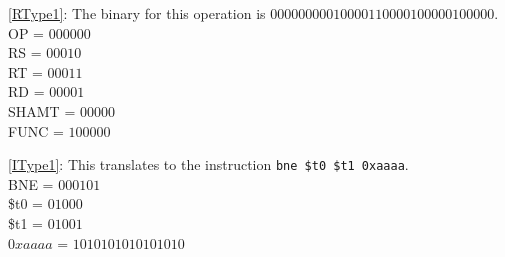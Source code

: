 \documentclass{article}
\begin{document}
\ref{RType1}: The binary for this operation is $000000 00010 00011 00001 00000 100000$. \\ OP = $000000$ \\ RS = $00010$ \\ RT = $00011$ \\ RD = $00001$ \\ SHAMT = $00000$ \\ FUNC = $100000$

\ref{IType1}: This translates to the instruction \texttt{bne \$t0 \$t1 0xaaaa}. \\ BNE = $000101$ \\ \$t0 = $01000$ \\ \$t1 = $01001$ \\ $0xaaaa$ = $1010101010101010$

\printindex
\end{document}
